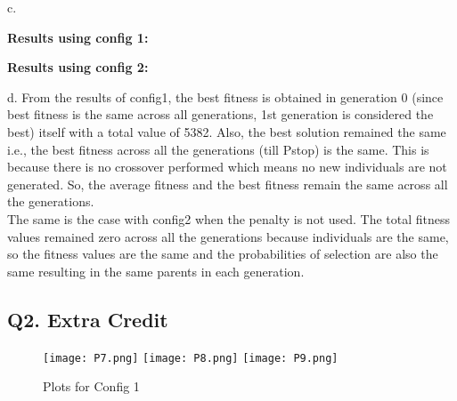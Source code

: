 \documentclass{article}
\begin{document}
c. 
{\textbf{Results using config 1:} \\
\begin{table}[H]
\centering
{}
\caption{Best Individual across all generations} 
\end{table} 

{\textbf{Results using config 2:} \\
\begin{table}[H]
\centering
{}
\caption{Best Individual across all generations} 
\end{table} 

d. From the results of config1, the best fitness is obtained in generation 0 (since best fitness is the same across all generations, 1st generation is considered the best) itself with a total value of 5382. Also, the best solution remained the same i.e., the best fitness across all the generations (till Pstop) is the same. This is because there is no crossover performed which means no new individuals are not generated. So, the average fitness and the best fitness remain the same across all the generations. \\
The same is the case with config2 when the penalty is not used. The total fitness values remained zero across all the generations because individuals are the same, so the fitness values are the same and the probabilities of selection are also the same resulting in the same parents in each generation. \\

\subsection*{\textbf{Q2. Extra Credit}}
\begin{figure}[h]
\centering
{
\texttt{[image: P7.png]}
}
{
\texttt{[image: P8.png]}
}
{
\texttt{[image: P9.png]}
}
\caption{Plots for Config 1}
\label{}
\end{figure}

}}
\end{document}
